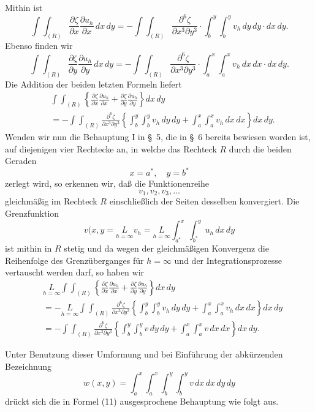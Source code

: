 \documentclass{article}
\begin{document}
Mithin ist
\[
\int\!\!\int_{(R)} \frac{\partial\zeta}{\partial x} \frac{\partial u_h}{\partial x}\,dx\,dy = -\int\!\!\int_{(R)} \frac{\partial^6\zeta}{\partial x^3 \partial y^3} \cdot \int_b^y \int_b^y v_h\,dy\,dy \cdot dx\,dy.
\]
Ebenso finden wir
\[
\int\!\!\int_{(R)} \frac{\partial\zeta}{\partial y} \frac{\partial u_h}{\partial y}\,dx\,dy = -\int\!\!\int_{(R)} \frac{\partial^6\zeta}{\partial x^3 \partial y^3} \cdot \int_a^x \int_a^x v_h\,dx\,dx \cdot dx\,dy.
\]
Die Addition der beiden letzten Formeln liefert
\[
\begin{aligned}
& \int\!\!\int_{(R)} \left\{ \frac{\partial\zeta}{\partial x} \frac{\partial u_h}{\partial x} + \frac{\partial\zeta}{\partial y} \frac{\partial u_h}{\partial y} \right\} dx\,dy \\
&= -\int\!\!\int_{(R)} \frac{\partial^6\zeta}{\partial x^3 \partial y^3} \left\{ \int_b^y \int_b^y v_h\,dy\,dy + \int_a^x \int_a^x v_h\,dx\,dx \right\} dx\,dy.
\end{aligned}
\]
Wenden wir nun die Behauptung I in §~5, die in §~6 bereits bewiesen worden ist, auf diejenigen vier Rechtecke an, in welche das Rechteck $R$ durch die beiden Geraden
\[
x = a^*, \quad y = b^*
\]
zerlegt wird, so erkennen wir, daß die Funktionenreihe
\[
v_1, v_2, v_3, \dots
\]
gleichmäßig im Rechteck $R$ einschließlich der Seiten desselben konvergiert. Die Grenzfunktion
\[
v(x, y = \underset{h=\infty}{L} v_h = \underset{h=\infty}{L} \int_{a^*}^x \int_{b^*}^y u_h\,dx\,dy
\]
ist mithin in $R$ stetig und da wegen der gleichmäßigen Konvergenz die Reihenfolge des Grenzüberganges für $h=\infty$ und der Integrationsprozesse vertauscht werden darf, so haben wir
\[
\begin{aligned}
& \underset{h=\infty}{L} \int\!\!\int_{(R)} \left\{ \frac{\partial\zeta}{\partial x} \frac{\partial u_h}{\partial x} + \frac{\partial\zeta}{\partial y} \frac{\partial u_h}{\partial y} \right\} dx\,dy \\
&= -\underset{h=\infty}{L} \int\!\!\int_{(R)} \frac{\partial^6\zeta}{\partial x^3 \partial y^3} \left\{ \int_b^y \int_b^y v_h\,dy\,dy + \int_a^x \int_a^x v_h\,dx\,dx \right\} dx\,dy \\
&= -\int\!\!\int_{(R)} \frac{\partial^6\zeta}{\partial x^3 \partial y^3} \left\{ \int_b^y \int_b^y v\,dy\,dy + \int_a^x \int_a^x v\,dx\,dx \right\} dx\,dy.
\end{aligned}
\]

Unter Benutzung dieser Umformung und bei Einführung der abkürzenden Bezeichnung
\[
w(x, y) = \int_a^x \int_a^x \int_b^y \int_b^y v\,dx\,dx\,dy\,dy
\]
drückt sich die in Formel (11) ausgesprochene Behauptung wie folgt aus.
\end{document}
